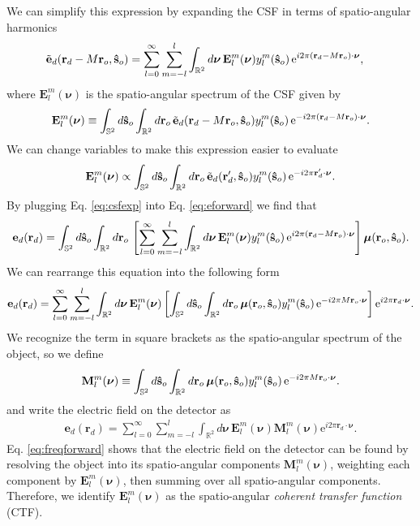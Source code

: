 \documentclass[11pt]{article}
\newcommand{\me}{\mathrm{e}}
\providecommand{\mb}[1]{\mathbf{#1}}
\providecommand{\ro}[1]{\mathbf{\mathbf{r}}_o}
\providecommand{\so}[1]{\mathbf{\hat{s}}_o}
\providecommand{\rd}[1]{\mathbf{r}_d}
\providecommand{\bs}[1]{\boldsymbol{#1}}
\begin{document}
We can simplify this expression by expanding the CSF in terms of spatio-angular
harmonics
\begin{align}
  \tilde{\mb{e}}_d(\rd{} - M\mb{r}_o, \so{}) &= \sum_{l=0}^{\infty} \sum_{m=-l}^l \int_{\mathbb{R}^2}d\bs{\nu}{}\, \mb{E}_l^m(\bs{\nu})y_l^m(\so{})\thinspace\me^{i 2\pi (\rd{} - M\ro{})\cdot\bs{\nu}},\label{eq:csfexp}
\end{align}
where $\mb{E}_l^m(\bs{\nu})$ is the spatio-angular spectrum of the CSF given
by
\begin{align}
  \mb{E}_l^m(\bs{\nu}) \equiv \int_{\mathbb{S}^2}d\so{}\int_{\mathbb{R}^2}d\ro{}\, \tilde{\mb{e}}_d(\rd{} - M\ro{}, \so{}) y_l^m(\so{})\thinspace\me^{-i 2\pi (\rd{} - M\ro{})\cdot\bs{\nu}}.\label{eq:csfdef}
\end{align}
We can change variables to make this expression easier to evaluate
\begin{align}
  \mb{E}_l^m(\bs{\nu}) \propto \int_{\mathbb{S}^2}d\so{}\int_{\mathbb{R}^2}d\ro{}\, \tilde{\mb{e}}_d(\rd{}', \so{}) y_l^m(\so{})\thinspace\me^{-i 2\pi \rd{}'\cdot\bs{\nu}}.\label{eq:csfdef2}
\end{align}
By plugging Eq. \ref{eq:csfexp} into Eq. \ref{eq:eforward} we find that
\begin{align}
  \mb{e}_d(\rd{}) = \int_{\mathbb{S}^2}d\so{}\int_{\mathbb{R}^2}d\ro{}\, \left[\sum_{l=0}^{\infty} \sum_{m=-l}^l \int_{\mathbb{R}^2}d\bs{\nu}{}\, \mb{E}_l^m(\bs{\nu})y_l^m(\so{})\thinspace\me^{i 2\pi (\rd{} - M\ro{})\cdot\bs{\nu}}\right]\bs{\mu}(\ro{}, \so{}). \label{eq:freqforward}
\end{align}
We can rearrange this equation into the following form
\begin{align}
  \mb{e}_d(\rd{}) = \sum_{l=0}^{\infty} \sum_{m=-l}^l \int_{\mathbb{R}^2}d\bs{\nu}{}\, \mb{E}_l^m(\bs{\nu}) \left[\int_{\mathbb{S}^2}d\so{}\int_{\mathbb{R}^2}d\ro{}\, \bs{\mu}(\ro{}, \so{})y_l^m(\so{})\thinspace\me^{-i 2\pi M\ro{}\cdot\bs{\nu}}\right] \me^{i 2\pi \rd{}\cdot\bs{\nu}}. \label{eq:freqforward}
\end{align}
We recognize the term in square brackets as the spatio-angular spectrum of the
object, so we define
\begin{align}
\mb{M}_l^m(\bs{\nu}) \equiv \int_{\mathbb{S}^2}d\so{}\int_{\mathbb{R}^2}d\ro{} \, \bs{\mu}(\mb{r}_o, \so{}) y_l^m(\so{})\thinspace\me^{-i 2\pi M\ro{}\cdot\bs{\nu}}.  
\end{align}
and write the electric field on the detector as
\begin{align}
  \mb{e}_d(\rd{}) = \sum_{l=0}^{\infty} \sum_{m=-l}^l \int_{\mathbb{R}^2}d\bs{\nu}{}\, \mb{E}_l^m(\bs{\nu}) \mb{M}_l^m(\mb{\nu}) \me^{i 2\pi \rd{}\cdot\bs{\nu}}. \label{eq:freqforward}
\end{align}
Eq. \ref{eq:freqforward} shows that the electric field on the detector can be
found by resolving the object into its spatio-angular components
$\mb{M}_l^m(\bs{\nu})$, weighting each component by $\mb{E}_l^m(\bs{\nu})$,
then summing over all spatio-angular components. Therefore, we identify
$\mb{E}_l^m(\bs{\nu})$ as the spatio-angular \textit{coherent transfer
  function} (CTF).
\end{document}
